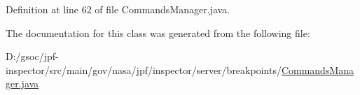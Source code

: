 Definition at line 62 of file Commands\+Manager.\+java.



The documentation for this class was generated from the following file\+:\begin{DoxyCompactItemize}
\item 
D\+:/gsoc/jpf-\/inspector/src/main/gov/nasa/jpf/inspector/server/breakpoints/\hyperlink{_commands_manager_8java}{Commands\+Manager.\+java}\end{DoxyCompactItemize}
